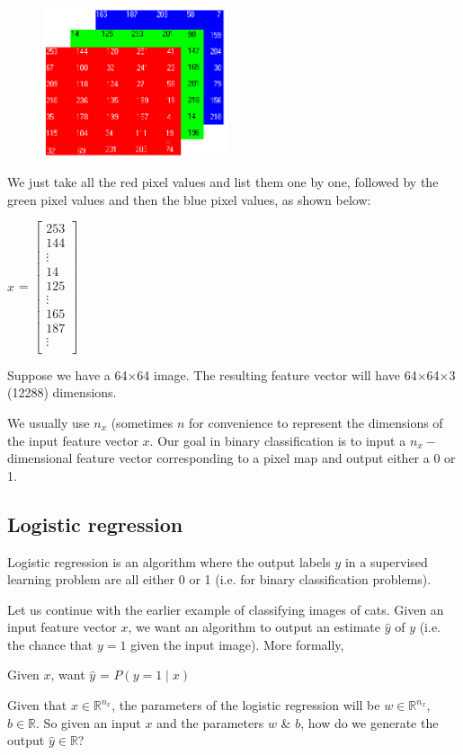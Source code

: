 \documentclass{article}[a4paper,12pt]
\theoremstyle{definition}
\begin{document}
\begin{figure}
\centering \includegraphics[width=0.48\textwidth]{rgb_matrices.png}
\end{figure}

We just take all the red pixel values and list them one by one, followed by the green pixel values and then the blue pixel values, as shown below:
\begin{center}
$x$ =
$\begin{bmatrix}
	253\\
	144\\
	\vdots\\
	14\\
	125\\
	\vdots\\
	165\\
	187\\
	\vdots\\
\end{bmatrix}$
\end{center}
Suppose we have a 64$\times$64 image. The resulting feature vector will have 64$\times$64$\times$3 (12288) dimensions.
\vspace{-6pt}

We usually use $n_x$ (sometimes $n$ for convenience to represent the dimensions of the input feature vector $x$. Our goal in binary classification is to input a $n_x-$dimensional feature vector corresponding to a pixel map and output either a 0 or 1. 
\subsection{Logistic regression}
Logistic regression is an algorithm where the output labels $y$ in a supervised learning problem are all either 0 or 1 (i.e. for binary classification problems).
\vspace{6pt}

Let us continue with the earlier example of classifying images of cats. Given an input feature vector $x$, we want an algorithm to output an estimate $\hat{y}$ of $y$ (i.e. the chance that $y=1$ given the input image). More formally, 
\begin{center}
Given $x$, want $\hat{y}$ = $P(y=1\mid x)$
\end{center}
Given that $x\in\mathbb{R}^{n_x}$, the parameters of the logistic regression will be $w\in\mathbb{R}^{n_x}$, $b\in\mathbb{R}$. So given an input $x$ and the parameters $w$ \& $b$, how do we generate the output $\hat{y}\in\mathbb{R}$? 
\vspace{6pt}
\end{document}
